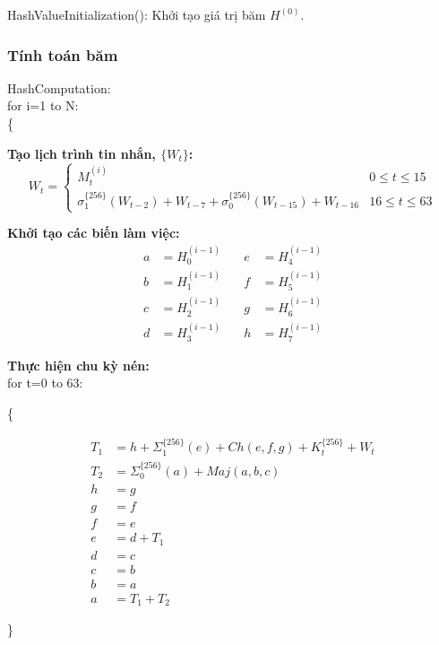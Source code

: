 			HashValueInitialization(): Khởi tạo giá trị băm $H^{(0)}$.

\subsubsection{Tính toán băm}

	HashComputation:\\
	
		for i=1 to N:\\
		
		\{
		
		\qquad \textbf{Tạo lịch trình tin nhắn, $\{W_t\}$:}
			\[
			W_t = \begin{cases} 
				M_t^{(i)} & 0 \leq t \leq 15 \\
				\sigma_1^{\{256\}}(W_{t-2}) + W_{t-7} + \sigma_0^{\{256\}}(W_{t-15}) + W_{t-16} & 16 \leq t \leq 63 
			\end{cases}
			\]
		
		\qquad \textbf{Khởi tạo các biến làm việc:}
			\begin{align*}
				a &= H_0^{(i-1)} \quad & e &= H_4^{(i-1)} \\
				b &= H_1^{(i-1)} \quad & f &= H_5^{(i-1)} \\
				c &= H_2^{(i-1)} \quad & g &= H_6^{(i-1)} \\
				d &= H_3^{(i-1)} \quad & h &= H_7^{(i-1)}
			\end{align*}
			
		\qquad \textbf{Thực hiện chu kỳ nén:}\\
		
			\qquad \qquad for t=0 to 63:
			
			\qquad \qquad \{
			
				\begin{align*}
					T_1 &= h + \Sigma_1^{\{256\}}(e)+Ch(e,f,g)+K_t^{\{256\}}+ W_t \\
					T_2 &= \Sigma_0^{\{256\}}(a) + Maj(a,b,c) \\
					h &= g \\
					g &= f \\
					f &= e \\
					e &= d + T_1 \\
					d &= c\\
					c &= b\\
					b &= a\\
					a &= T_1 + T_2
				\end{align*}
				
			\qquad \qquad \}
			
